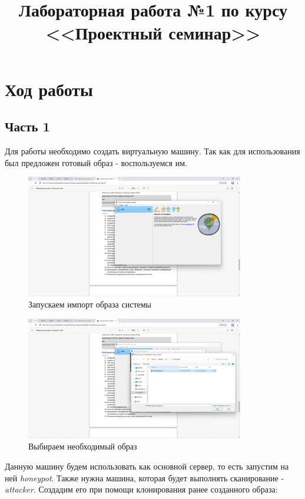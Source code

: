 \documentclass[a4paper]{article}
\title{
  Лабораторная работа №1 по курсу \\
  <<Проектный семинар>>  
}
\begin{document}
  \templatedtitlepage
  
  \toc
  \section{Ход работы}

  \subsection{Часть 1}

  Для работы необходимо создать виртуальную машину. Так как для использования
  был предложен готовый образ - воспользуемся им.
  \begin{figure}[H]
    \centering
    \includegraphics[width=0.85\textwidth]{00_00 (2)}
    \caption{Запускаем импорт образа системы}
  \end{figure}

  \begin{figure}[H]
    \centering
    \includegraphics[width=0.85\textwidth]{00_00 (4)}
    \caption{Выбираем необходимый образ}
  \end{figure}
  
  Данную машину будем использовать как основной сервер, то есть запустим на ней \textit{honeypot}.
  Также нужна машина, которая будет выполнять сканирование - \textit{attacker}. 
  Создадим его при помощи клонирования ранее созданного образа:
  
\end{document}
